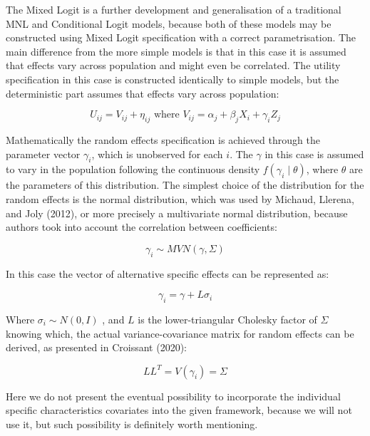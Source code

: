 \documentclass[12pt,]{article}
\begin{document}
The Mixed Logit is a further development and generalisation of a
traditional MNL and Conditional Logit models, because both of these
models may be constructed using Mixed Logit specification with a correct
parametrisation. The main difference from the more simple models is that
in this case it is assumed that effects vary across population and might
even be correlated. The utility specification in this case is
constructed identically to simple models, but the deterministic part
assumes that effects vary across population:

\begin{equation}
U_{ij} = V_{ij} + \eta_{ij} \text{ where } V_{ij} = \alpha_j + \beta_j X_i + \gamma_i Z_j
\end{equation}

Mathematically the random effects specification is achieved through the
parameter vector \(\gamma_i\), which is unobserved for each \(i\). The
\(\gamma\) in this case is assumed to vary in the population following
the continuous density \(f(\gamma_i \mid \theta)\), where \(\theta\) are
the parameters of this distribution. The simplest choice of the
distribution for the random effects is the normal distribution, which
was used by Michaud, Llerena, and Joly (2012), or more precisely a
multivariate normal distribution, because authors took into account the
correlation between coefficients:

\begin{equation}
\gamma_i \sim MVN(\gamma, \Sigma)
\end{equation}

In this case the vector of alternative specific effects can be
represented as:

\begin{equation}
\gamma_i = \gamma + L \sigma_i
\end{equation}

Where \(\sigma_i \sim N(0, I)\) , and \(L\) is the lower-triangular
Cholesky factor of \(\Sigma\) knowing which, the actual
variance-covariance matrix for random effects can be derived, as
presented in Croissant (2020):

\begin{equation}
LL^T = V(\gamma_i) = \Sigma
\end{equation}

Here we do not present the eventual possibility to incorporate the
individual specific characteristics covariates into the given framework,
because we will not use it, but such possibility is definitely worth
mentioning.
\end{document}
